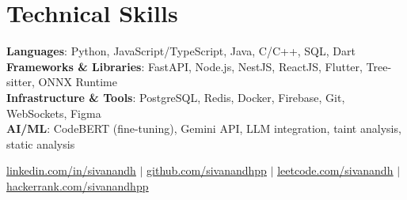 \documentclass[a4paper,11pt]{article}
\begin{document}
\section{Technical Skills}
 \begin{itemize}[leftmargin=0.15in, label={}]
    \small{\item{
     \textbf{Languages}{: Python, JavaScript/TypeScript, Java, C/C++, SQL, Dart} \\
     \textbf{Frameworks \& Libraries}{: FastAPI, Node.js, NestJS, ReactJS, Flutter, Tree-sitter, ONNX Runtime} \\
     \textbf{Infrastructure \& Tools}{: PostgreSQL, Redis, Docker, Firebase, Git, WebSockets, Figma} \\
     \textbf{AI/ML}{: CodeBERT (fine-tuning), Gemini API, LLM integration, taint analysis, static analysis}
    }}
 \end{itemize}
\vspace{10pt}
\begin{center}
    \small 
    \href{https://linkedin.com/in/sivanandh}{\underline{linkedin.com/in/sivanandh}} $|$ 
    \href{https://github.com/sivanandhpp}{\underline{github.com/sivanandhpp}} $|$
    \href{https://leetcode.com/sivanandh}{\underline{leetcode.com/sivanandh}} $|$
    \href{https://hackerrank.com/sivanandhpp}{\underline{hackerrank.com/sivanandhpp}}
\end{center}
\end{document}
